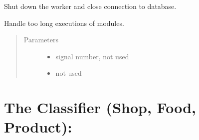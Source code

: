 \documentclass[letterpaper,10pt,english]{sphinxmanual}
\begin{document}
\begin{fulllineitems}
\begin{fulllineitems}
\begin{quote}
\begin{description}
\begin{itemize}
\end{itemize}

\end{description}\end{quote}

\end{fulllineitems}


\begin{fulllineitems}
\label{\detokenize{api:worker.Worker.shutdown}}
Shut down the worker and close connection to database.

\end{fulllineitems}


\end{fulllineitems}


\begin{fulllineitems}
\label{\detokenize{api:worker.handler}}
Handle too long executions of modules.
\begin{quote}\begin{description}
\item[{Parameters}] \leavevmode\begin{itemize}
\item {} 
 \textendash{} signal number, not used

\item {} 
 \textendash{} not used

\end{itemize}

\end{description}\end{quote}

\end{fulllineitems}



\section{The Classifier (Shop, Food, Product):}
\label{\detokenize{api:the-classifier-shop-food-product}}\label{\detokenize{api:module-classifier}}
\end{document}
